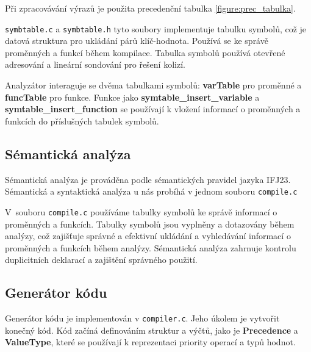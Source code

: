 \documentclass[a4paper, 11pt]{article}
\begin{document}
	Při zpracovávání výrazů je použita precedenční tabulka \ref{figure:prec_tabulka}. 

        \verb|symbtable.c| a \verb|symbtable.h| tyto soubory implementuje tabulku symbolů, což je datová struktura pro ukládání párů klíč-hodnota. Používá se ke správě proměnných a funkcí během kompilace. Tabulka symbolů používá otevřené adresování a lineární sondování pro řešení kolizí.

        Analyzátor interaguje se dvěma tabulkami symbolů: \textbf{varTable}  pro proměnné a \textbf{funcTable} pro funkce.
        Funkce jako \textbf{symtable\_insert\_variable} a \textbf{symtable\_insert\_function} se používají k vložení informací o proměnných a funkcích do příslušných tabulek symbolů.
        

	\subsection{Sémantická analýza}

	Sémantická analýza je prováděna podle sémantických pravidel jazyka IFJ23. Sémantická a syntaktická analýza u nás probíhá v jednom souboru \verb|compile.c|

    V~souboru \verb|compile.c| používáme tabulky symbolů ke správě informací o proměnných a funkcích. Tabulky symbolů jsou vyplněny a dotazovány během analýzy, což zajišťuje správné a efektivní ukládání a vyhledávání informací o proměnných a funkcích během analýzy.
    Sémantická analýza zahrnuje kontrolu duplicitních deklarací a zajištění správného použití.



	\subsection{Generátor kódu}
 
        Generátor kódu je implementován v \texttt{compiler.c}. Jeho úkolem je vytvořit
        konečný kód. Kód začíná definováním struktur a výčtů, jako je \textbf{Precedence} a \textbf{ValueType}, které se používají k reprezentaci priority operací a typů hodnot.
\end{document}
